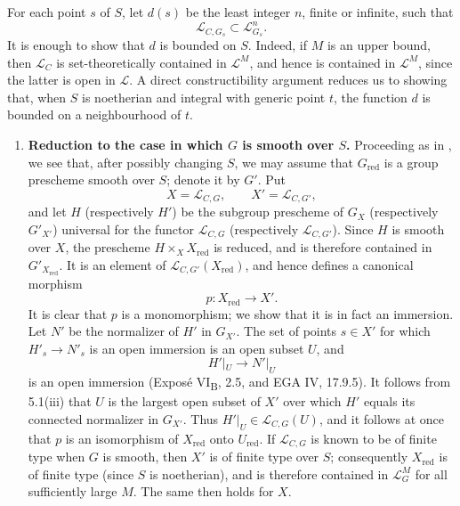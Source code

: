 For each point \(s\) of \(S\), let \(d(s)\) be the least integer \(n\), finite or
infinite, such that
\[
\mathcal L_{C,G_s}\subset\mathcal L^n_{G_s}.
\]
It is enough to show that \(d\) is bounded on \(S\). Indeed, if \(M\) is an
upper bound, then \(\mathcal L_C\) is set-theoretically contained in
\(\mathcal L^M\), and hence is contained in \(\mathcal L^M\), since the latter
is open in \(\mathcal L\). A direct constructibility argument reduces us to
showing that, when \(S\) is noetherian and integral with generic point \(t\),
the function \(d\) is bounded on a neighbourhood of \(t\).

\begin{enumerate}
\renewcommand{\labelenumi}{\alph{enumi})}
\item \textbf{Reduction to the case in which \(G\) is smooth over \(S\).}
Proceeding as in , we see that, after possibly changing \(S\), we may assume
that \(G_{\mathrm{red}}\) is a group prescheme smooth over \(S\); denote it by
\(G'\). Put
\[
X=\mathcal L_{C,G},\qquad X'=\mathcal L_{C,G'},
\]
and let \(H\) (respectively \(H'\)) be the subgroup prescheme of \(G_X\)
(respectively \(G'_{X'}\)) universal for the functor
\(\mathcal L_{C,G}\) (respectively \(\mathcal L_{C,G'}\)).
Since \(H\) is smooth over \(X\), the prescheme
\(H\times_X X_{\mathrm{red}}\) is reduced, and is therefore contained in
\(G'_{X_{\mathrm{red}}}\). It is an element of
\(\mathcal L_{C,G'}(X_{\mathrm{red}})\), and hence defines a canonical
morphism
\[
p:X_{\mathrm{red}}\longrightarrow X'.
\]
It is clear that \(p\) is a monomorphism; we show that it is in fact an
immersion. Let \(N'\) be the normalizer of \(H'\) in \(G_{X'}\).
The set of points \(s\in X'\) for which
\(H'_s\to N'_s\) is an open immersion is an open subset \(U\), and
\[
H'|_U\longrightarrow N'|_U
\]
is an open immersion (Exposé VI\textsubscript{B}, 2.5, and EGA IV, 17.9.5).
It follows from 5.1(iii) that \(U\) is the largest open subset of \(X'\)
over which \(H'\) equals its connected normalizer in \(G_{X'}\).
Thus \(H'|_U\in\mathcal L_{C,G}(U)\), and it follows at once that \(p\)
is an isomorphism of \(X_{\mathrm{red}}\) onto \(U_{\mathrm{red}}\).
If \(\mathcal L_{C,G}\) is known to be of finite type when \(G\) is smooth,
then \(X'\) is of finite type over \(S\); consequently
\(X_{\mathrm{red}}\) is of finite type (since \(S\) is noetherian), and is
therefore contained in \(\mathcal L_G^M\) for all sufficiently large \(M\).
The same then holds for \(X\).


\end{enumerate}
